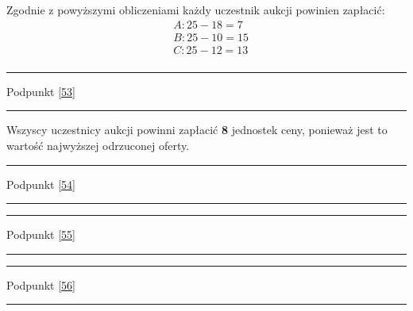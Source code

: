 \documentclass[
    12pt, %
]{../fphw}
\begin{document}
Zgodnie z powyższymi obliczeniami każdy uczestnik aukcji powinien zapłacić:
\begin{align*}
     & A: 25 -  18 = 7  \\
     & B: 25 -  10 = 15 \\
     & C: 25 -  12 = 13 \\
\end{align*}
\par\noindent\rule{\textwidth}{0.4pt}
Podpunkt \ref{53}
\par\noindent\rule{\textwidth}{0.4pt}
Wszyscy uczestnicy aukcji powinni zapłacić \textbf{8} jednostek ceny,
ponieważ jest to wartość najwyższej odrzuconej oferty.
\par\noindent\rule{\textwidth}{0.4pt}
Podpunkt \ref{54}
\par\noindent\rule{\textwidth}{0.4pt}

\par\noindent\rule{\textwidth}{0.4pt}
Podpunkt \ref{55}
\par\noindent\rule{\textwidth}{0.4pt}

\par\noindent\rule{\textwidth}{0.4pt}
Podpunkt \ref{56}
\par\noindent\rule{\textwidth}{0.4pt}


\newpage
\lstlistoflistings
\listoffigures
\listoftables
\end{document}
